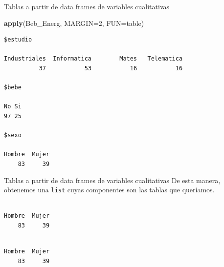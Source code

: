 \documentclass[
  ignorenonframetext,
]{beamer}
\newenvironment{Shaded}{\begin{snugshade}}{\end{snugshade}}
\newcommand{\AttributeTok}[1]{\textcolor[rgb]{0.13,0.29,0.53}{#1}}
\newcommand{\DecValTok}[1]{\textcolor[rgb]{0.00,0.00,0.81}{#1}}
\newcommand{\FunctionTok}[1]{\textcolor[rgb]{0.13,0.29,0.53}{\textbf{#1}}}
\newcommand{\NormalTok}[1]{#1}
\newcommand{\SpecialCharTok}[1]{\textcolor[rgb]{0.81,0.36,0.00}{\textbf{#1}}}
\begin{document}
\begin{frame}[fragile]{Tablas a partir de data frames de variables
cualitativas}
\label{tablas-a-partir-de-data-frames-de-variables-cualitativas-5}
\begin{Shaded}
\begin{Highlighting}[]
\FunctionTok{apply}\NormalTok{(Beb\_Energ, }\AttributeTok{MARGIN=}\DecValTok{2}\NormalTok{, }\AttributeTok{FUN=}\NormalTok{table)}
\end{Highlighting}
\end{Shaded}

\begin{verbatim}
$estudio

Industriales  Informatica        Mates   Telematica 
          37           53           16           16 

$bebe

No Si 
97 25 

$sexo

Hombre  Mujer 
    83     39 
\end{verbatim}
\end{frame}

\begin{frame}[fragile]{Tablas a partir de data frames de variables
cualitativas}
\label{tablas-a-partir-de-data-frames-de-variables-cualitativas-6}
De esta manera, obtenemos una \texttt{list} cuyas componentes son las
tablas que queríamos.

\begin{Shaded}
\end{Shaded}

\begin{verbatim}

Hombre  Mujer 
    83     39 
\end{verbatim}

\begin{Shaded}
\end{Shaded}

\begin{verbatim}

Hombre  Mujer 
    83     39 
\end{verbatim}
\end{frame}
\end{document}

